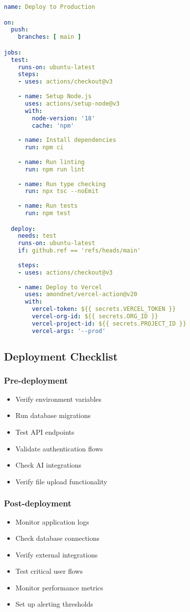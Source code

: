 \begin{lstlisting}[language=YAML, caption=.github/workflows/deploy.yml]
name: Deploy to Production

on:
  push:
    branches: [ main ]

jobs:
  test:
    runs-on: ubuntu-latest
    steps:
    - uses: actions/checkout@v3
    
    - name: Setup Node.js
      uses: actions/setup-node@v3
      with:
        node-version: '18'
        cache: 'npm'
    
    - name: Install dependencies
      run: npm ci
    
    - name: Run linting
      run: npm run lint
    
    - name: Run type checking
      run: npx tsc --noEmit
    
    - name: Run tests
      run: npm test

  deploy:
    needs: test
    runs-on: ubuntu-latest
    if: github.ref == 'refs/heads/main'
    
    steps:
    - uses: actions/checkout@v3
    
    - name: Deploy to Vercel
      uses: amondnet/vercel-action@v20
      with:
        vercel-token: ${{ secrets.VERCEL_TOKEN }}
        vercel-org-id: ${{ secrets.ORG_ID }}
        vercel-project-id: ${{ secrets.PROJECT_ID }}
        vercel-args: '--prod'
\end{lstlisting}

\subsection{Deployment Checklist}

\subsubsection{Pre-deployment}
\begin{itemize}
\item Verify environment variables
\item Run database migrations
\item Test API endpoints
\item Validate authentication flows
\item Check AI integrations
\item Verify file upload functionality
\end{itemize}

\subsubsection{Post-deployment}
\begin{itemize}
\item Monitor application logs
\item Check database connections
\item Verify external integrations
\item Test critical user flows
\item Monitor performance metrics
\item Set up alerting thresholds
\end{itemize}